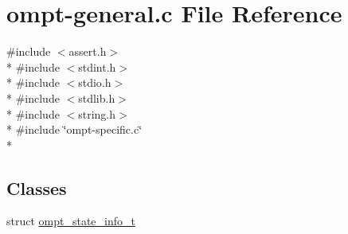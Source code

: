 \hypertarget{ompt-general_8c}{\section{ompt-\/general.c File Reference}
\label{ompt-general_8c}
}
{\ttfamily \#include $<$assert.\-h$>$}\\*
{\ttfamily \#include $<$stdint.\-h$>$}\\*
{\ttfamily \#include $<$stdio.\-h$>$}\\*
{\ttfamily \#include $<$stdlib.\-h$>$}\\*
{\ttfamily \#include $<$string.\-h$>$}\\*
{\ttfamily \#include \char`\"{}ompt-\/specific.\-c\char`\"{}}\\*
\subsection*{Classes}
\begin{DoxyCompactItemize}
\item 
struct \hyperlink{structompt__state__info__t}{ompt\-\_\-state\-\_\-info\-\_\-t}
\end{DoxyCompactItemize}
